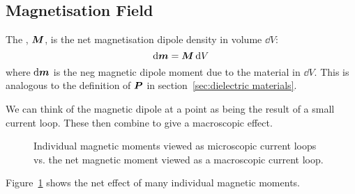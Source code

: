     \subsection{Magnetisation Field}
    The , \(\bm{M}\), is the net magnetisation dipole density in volume \(\dd{V}\):
    \[\dd{\bm{m}} = \bm{M}\dd{V}\]
    where \(\dd{\bm{m}}\) is the neg magnetic dipole moment due to the material in \(\dd{V}\).
    This is analogous to the definition of \(\bm{P}\) in section~\ref{sec:dielectric materials}.
    
    We can think of the magnetic dipole at a point as being the result of a small current loop.
    These then combine to give a macroscopic effect.
    \begin{figure}
        \centering
        \caption{Individual magnetic moments viewed as microscopic current loops vs. the net magnetic moment viewed as a macroscopic current loop.}
        \label{fig:magnetisation due to homogenous magnetic field}
    \end{figure}
    Figure~\ref{fig:magnetisation due to homogenous magnetic field} shows the net effect of many individual magnetic moments.

